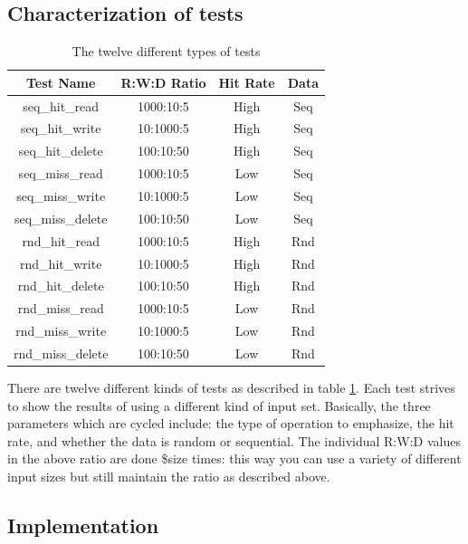 \documentclass[twocolumn,11pt]{article}
\begin{document}
\subsection{Characterization of tests}
\label{subsec:characterization_tests}

\begin{table}[h!]
  \begin{tabular}{ |c|c|c|c| }
    \hline
    Test Name & R:W:D Ratio & Hit Rate & Data \\
    \hline \hline
    seq\_hit\_read & 1000:10:5 & High & Seq \\ \hline
    seq\_hit\_write & 10:1000:5 & High & Seq \\ \hline
    seq\_hit\_delete & 100:10:50 & High & Seq \\ \hline
    seq\_miss\_read & 1000:10:5 & Low & Seq \\ \hline
    seq\_miss\_write & 10:1000:5 & Low & Seq \\ \hline
    seq\_miss\_delete & 100:10:50 & Low & Seq \\ \hline
    rnd\_hit\_read & 1000:10:5 & High & Rnd \\ \hline
    rnd\_hit\_write & 10:1000:5 & High & Rnd \\ \hline
    rnd\_hit\_delete & 100:10:50 & High & Rnd \\ \hline
    rnd\_miss\_read & 1000:10:5 & Low & Rnd \\ \hline
    rnd\_miss\_write & 10:1000:5 & Low & Rnd \\ \hline
    rnd\_miss\_delete & 100:10:50 & Low & Rnd \\ \hline
  \end{tabular}
  \caption{The twelve different types of tests}
  \label{tab:types_of_tests}
\end{table}

There are twelve different kinds of tests as described in table
\ref{tab:types_of_tests}. Each test strives to show the results of using a
different kind of input set. Basically, the three parameters which are cycled
include: the type of operation to emphasize, the hit rate, and whether the data
is random or sequential. The individual R:W:D values in the above ratio are done
\$size times: this way you can use a variety of different input sizes but still
maintain the ratio as described above.

\subsection{Implementation}
\label{subsec:implementation}
\end{document}
